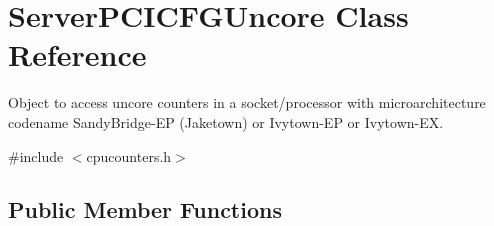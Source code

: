 \hypertarget{class_server_p_c_i_c_f_g_uncore}{}\section{Server\+P\+C\+I\+C\+F\+G\+Uncore Class Reference}
\label{class_server_p_c_i_c_f_g_uncore}


Object to access uncore counters in a socket/processor with microarchitecture codename Sandy\+Bridge-\/\+EP (Jaketown) or Ivytown-\/\+EP or Ivytown-\/\+EX.  




{\ttfamily \#include $<$cpucounters.\+h$>$}

\subsection*{Public Member Functions}
